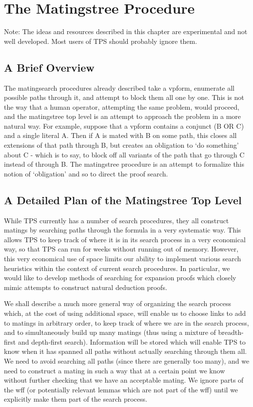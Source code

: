 \section{The Matingstree Procedure}\label{mtree}

Note: The ideas and resources described in this chapter are
experimental and not well developed. Most users of TPS should
probably ignore them.

\subsection{A Brief Overview}

The matingsearch procedures already described take a vpform, enumerate all possible
paths through it, and attempt to block them all one by one. This is not the way that
a human operator, attempting the same problem, would proceed, and the matingstree
top level is an attempt to approach the problem in a more natural way. For example,
suppose that a vpform contains a conjunct (B OR C) and a single literal A. Then if
A is mated with B on some path, this closes all extensions of that path through B, but
creates an obligation to `do something' about C - which is to say, to block off
all variants of the path that go through C instead of through B. The matingstree
procedure is an attempt to formalize this notion of `obligation' and so to direct the proof
search.


\subsection{A Detailed Plan of the Matingstree Top Level}

	While TPS currently has a number of search procedures, they
all construct matings by searching paths through the formula in a very
systematic way.  This allows TPS to keep track of where it is in its
search process in a very economical way, so that TPS can run for weeks
without running out of memory. However, this very economical use of
space limits our ability to implement various search heuristics within
the context of current search procedures. In particular, we would like
to develop methods of searching for expansion proofs which closely
mimic attempts to construct natural deduction proofs.

	We shall describe a much more general way of organizing the
search process which, at the cost of using additional space, will
enable us to choose links to add to matings in arbitrary order, to
keep track of where we are in the search process, and to
simultaneously build up many matings (thus using a mixture of
breadth-first and depth-first search).  Information will be stored
which will enable TPS to know when it has spanned all paths without
actually searching through them all.  We need to avoid searching all
paths (since there are generally too many), and we need to construct a
mating in such a way that at a certain point we know without further
checking that we have an acceptable mating.  We ignore parts of the
wff (or potentially relevant lemmas which are not part of the wff)
until we explicitly make them part of the search process.


